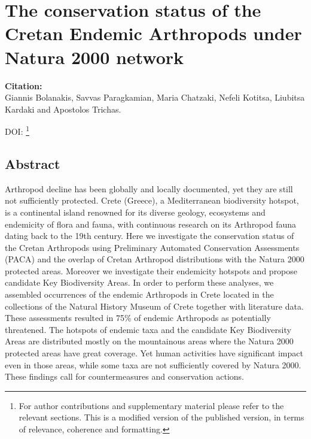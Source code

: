 % 
% 


\chapter{The conservation status of the Cretan Endemic Arthropods under Natura 2000 network}
\label{cha:arhropods}


\textbf{Citation:} \\ 
Giannis Bolanakis, Savvas Paragkamian, Maria Chatzaki, Nefeli Kotitsa, Liubitsa Kardaki and Apostolos Trichas. 

DOI: \href{https://doi.org/10.21203/rs.3.rs-2671168/v1}\footnote{
   For author contributions and supplementary material please refer to the relevant sections. 
   This is a modified version of the published version,
   in terms of relevance, coherence and formatting.
   }



\section{Abstract}

Arthropod decline has been globally and locally documented, yet they are still
not sufficiently protected. Crete (Greece), a Mediterranean biodiversity
hotspot, is a continental island renowned for its diverse geology, ecosystems
and endemicity of flora and fauna, with continuous research on its Arthropod
fauna dating back to the 19th century. Here we investigate the conservation
status of the Cretan Arthropods using Preliminary Automated Conservation
Assessments (PACA) and the overlap of Cretan Arthropod distributions with the
Natura 2000 protected areas. Moreover we investigate their endemicity hotspots
and propose candidate Key Biodiversity Areas. In order to perform these
analyses, we assembled occurrences of the endemic Arthropods in Crete located
in the collections of the Natural History Museum of Crete together with
literature data. These assessments resulted in 75\% of endemic Arthropods as
potentially threatened. The hotspots of endemic taxa and the candidate Key
Biodiversity Areas are distributed mostly on the mountainous areas where the
Natura 2000 protected areas have great coverage. Yet human activities have
significant impact even in those areas, while some taxa are not sufficiently
covered by Natura 2000. These findings call for countermeasures and conservation actions.


